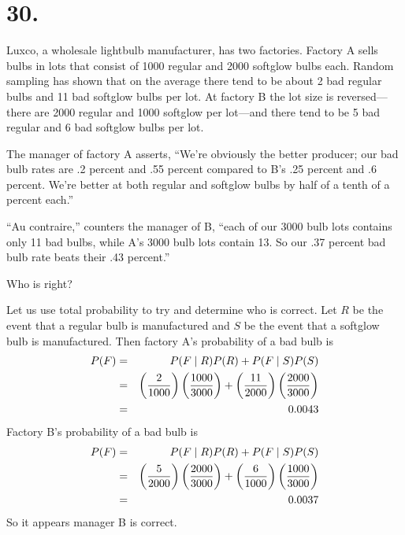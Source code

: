 \section*{30.}
Luxco, a wholesale lightbulb manufacturer, has two factories. Factory A sells
bulbs in lots that consist of 1000 regular and 2000 softglow bulbs each. Random
sampling has shown that on the average there tend to be about 2 bad
regular bulbs and 11 bad softglow bulbs per lot. At factory B the lot size is
reversed---there are 2000 regular and 1000 softglow per lot---and there tend
to be 5 bad regular and 6 bad softglow bulbs per lot.

\bigskip
\noindent
The manager of factory A asserts, ``We're obviously the better producer; our
bad bulb rates are .2 percent and .55 percent compared to B's .25 percent and
.6 percent. We're better at both regular and softglow bulbs by half of a tenth
of a percent each.''

\bigskip
\noindent
``Au contraire,'' counters the manager of B, ``each of our 3000 bulb lots contains
only 11 bad bulbs, while A's 3000 bulb lots contain 13. So our .37
percent bad bulb rate beats their .43 percent.''

\bigskip
\noindent
Who is right?

\bigskip
\noindent
Let us use total probability to try and determine who is correct.
Let $R$ be the event that a regular bulb is manufactured and $S$ be
the event that a softglow bulb is manufactured.
Then factory A's probability of a bad bulb is
\begin{eqnarray*}
P(F)&=&P(F\mid R)P(R)+P(F\mid S)P(S)\\
&=&\left({2\over1000}\right)\left({1000\over3000}\right)
+\left({11\over2000}\right)\left({2000\over3000}\right)\\
&=&0.0043
\end{eqnarray*}
Factory B's probability of a bad bulb is
\begin{eqnarray*}
P(F)&=&P(F\mid R)P(R)+P(F\mid S)P(S)\\
&=&\left({5\over2000}\right)\left({2000\over3000}\right)
+\left({6\over1000}\right)\left({1000\over3000}\right)\\
&=&0.0037
\end{eqnarray*}
So it appears manager B is correct.
